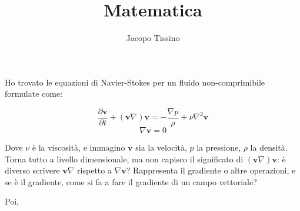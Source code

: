 \documentclass[12pt,a4paper]{article}
\author{Jacopo Tissino}
\title{Matematica}
\numberwithin{equation}{subsection}
\begin{document}
Ho trovato le equazioni di Navier-Stokes per un fluido non-comprimibile formulate come:

\begin{equation}
\frac{\partial \mathbf{v}}{\partial t} + ( \mathbf{v} \nabla ) \mathbf{v}  = -\frac{\nabla p}{\rho} + \nu \nabla^2 \mathbf{v}
\end{equation}
\begin{equation}
\nabla \mathbf{v} = 0
\end{equation}

Dove $\nu$ è la viscosità, e immagino $\mathbf{v}$ sia la velocità, $p$ la pressione, $\rho$ la densità. Torna tutto a livello dimensionale, ma non capisco il significato di $( \mathbf{v} \nabla ) \mathbf{v}$: è diverso scrivere $ \mathbf{v} \nabla $ rispetto a $ \nabla \mathbf{v} $? Rappresenta il gradiente o altre operazioni, e se è il gradiente, come si fa a fare il gradiente di un campo vettoriale?

Poi, 
\end{document}

